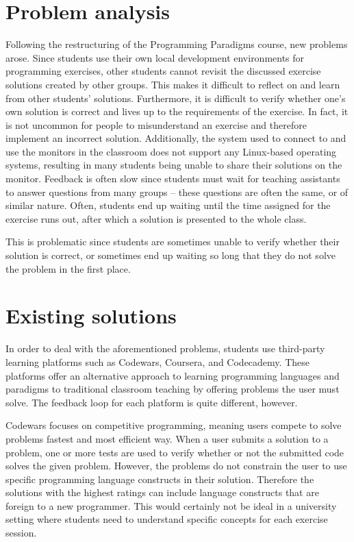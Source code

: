 \section{Problem analysis}
Following the restructuring of the Programming Paradigms course, new problems arose.
Since students use their own local development environments for programming exercises, other students cannot revisit the discussed exercise solutions created by other groups.
This makes it difficult to reflect on and learn from other students' solutions.
Furthermore, it is difficult to verify whether one's own solution is correct and lives up to the requirements of the exercise.
In fact, it is not uncommon for people to misunderstand an exercise and therefore implement an incorrect solution.
Additionally, the system used to connect to and use the monitors in the classroom does not support any Linux-based operating systems, resulting in many students being unable to share their solutions on the monitor.
Feedback is often slow since students must wait for teaching assistants to answer questions from many groups -- these questions are often the same, or of similar nature.
Often, students end up waiting until the time assigned for the exercise runs out, after which a solution is presented to the whole class.

This is problematic since students are sometimes unable to verify whether their solution is correct, or sometimes end up waiting so long that they do not solve the problem in the first place.

\section{Existing solutions}
In order to deal with the aforementioned problems, students use third-party learning platforms such as Codewars\cite{Codewars}, Coursera\cite{Coursera}, and Codecademy\cite{Codecademy}.
These platforms offer an alternative approach to learning programming languages and paradigms to traditional classroom teaching by offering problems the user must solve.
The feedback loop for each platform is quite different, however.


Codewars focuses on competitive programming, meaning users compete to solve problems fastest and most efficient way. 
When a user submits a solution to a problem, one or more tests are used to verify whether or not the submitted code solves the given problem. 
However, the problems do not constrain the user to use specific programming language constructs in their solution.
Therefore the solutions with the highest ratings can include language constructs that are foreign to a new programmer. 
This would certainly not be ideal in a university setting where students need to understand specific concepts for each exercise session.


